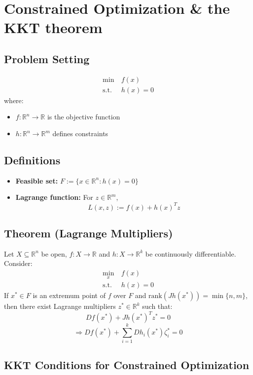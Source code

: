 \documentclass{article}
\begin{document}
\section{Constrained Optimization \& the KKT theorem}
\subsection*{Problem Setting}
\begin{align*}
\min\ & f(x) \\
\text{s.t.}\ & h(x) = 0
\end{align*}
where:
\begin{itemize}
    \item $f: \mathbb{R}^n \rightarrow \mathbb{R}$ is the objective function
    \item $h: \mathbb{R}^n \rightarrow \mathbb{R}^m$ defines constraints
\end{itemize}

\subsection*{Definitions}
\begin{itemize}
    \item \textbf{Feasible set:} $F := \{ x \in \mathbb{R}^n : h(x) = 0 \}$
    \item \textbf{Lagrange function:} For $z \in \mathbb{R}^m$,
    \[ L(x,z) := f(x) + h(x)^T z \]
\end{itemize}

\subsection{Theorem (Lagrange Multipliers)}
Let $X \subseteq \mathbb{R}^n$ be open, $f: X \rightarrow \mathbb{R}$ and $h: X \rightarrow \mathbb{R}^k$ be continuously differentiable. Consider:
\begin{align*}
\min_x\ & f(x) \\
\text{s.t.}\ & h(x) = 0
\end{align*}
If $x^* \in F$ is an extremum point of $f$ over $F$ and $\text{rank}(Jh(x^*)) = \min\{n,m\}$, then there exist Lagrange multipliers $z^* \in \mathbb{R}^k$ such that:
\[ Df(x^*) + Jh(x^*)^T z^* = 0 \]
\[ \Rightarrow Df(x^*) + \sum_{i=1}^k Dh_i(x^*) \zeta_i^* = 0 \]
\subsection{KKT Conditions for Constrained Optimization}
\end{document}
